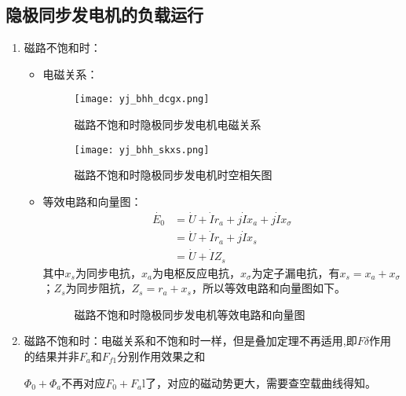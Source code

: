 \documentclass[blue]{elegantnote}
\begin{document}
\subsection{隐极同步发电机的负载运行}
\begin{enumerate}
	\item 磁路不饱和时：
	\begin{itemize}
		\item 电磁关系：
		\begin{figure}[!hbtp]
			\centering
			\texttt{[image: yj\_bhh\_dcgx.png]}
			\caption{磁路不饱和时隐极同步发电机电磁关系}           \label{figur:yj_bhh_dcgx}                           
		\end{figure}
		\begin{figure}[!hbtp]
			\centering
			\texttt{[image: yj\_bhh\_skxs.png]}
			\caption{磁路不饱和时隐极同步发电机时空相矢图}           \label{figur:yj_bhh_skxs}                           
		\end{figure}
		\item 等效电路和向量图：
		\begin{align*}
		\dot{E_0}&=\dot{U}+\dot{I}r_a+j\dot{I}x_a+j\dot{I}x_{\sigma}\\&=\dot{U}+\dot{I}r_a+j\dot{I}x_s\\&=\dot{U}+\dot{I}Z_s
		\end{align*}
		其中$x_s$为同步电抗，$x_a$为电枢反应电抗，$x_{\sigma}$为定子漏电抗，有$x_s=x_a+x_{\sigma}$；$Z_s$为同步阻抗，$Z_s=r_a+x_s$，所以等效电路和向量图如下。
		\begin{figure}[!hbtp]
			\centering
			\caption{磁路不饱和时隐极同步发电机等效电路和向量图}      
		\end{figure}
	\end{itemize}
	\item 磁路不饱和时：电磁关系和不饱和时一样，但是{\color{thid}叠加定理不再适用,即$F{\delta}$作用的结果并非$F_a$和$F_{f1}$分别作用效果之和}
	\begin{note}
		$\Phi_0+\Phi_a$不再对应$F_0+F_a$l了，对应的磁动势更大，需要查空载曲线得知。
	\end{note}	
\end{enumerate}
\end{document}

